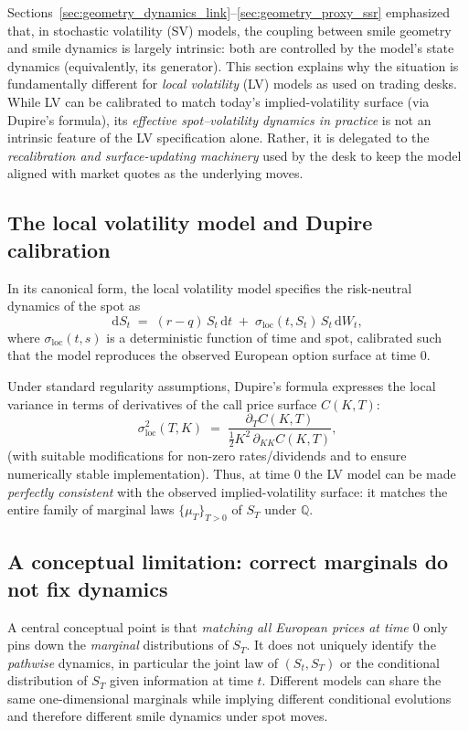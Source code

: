 \documentclass[11pt,a4paper]{report}
\begin{document}
Sections~\ref{sec:geometry_dynamics_link}--\ref{sec:geometry_proxy_ssr} emphasized that, in stochastic volatility (SV) models, the coupling between smile geometry and smile dynamics is largely intrinsic: both are controlled by the model's state dynamics (equivalently, its generator).
This section explains why the situation is fundamentally different for \emph{local volatility} (LV) models as used on trading desks.
While LV can be calibrated to match today's implied-volatility surface (via Dupire's formula), its \emph{effective spot--volatility dynamics in practice} is not an intrinsic feature of the LV specification alone.
Rather, it is delegated to the \emph{recalibration and surface-updating machinery} used by the desk to keep the model aligned with market quotes as the underlying moves.

\subsection{The local volatility model and Dupire calibration}
In its canonical form, the local volatility model specifies the risk-neutral dynamics of the spot as
\begin{equation}
\mathrm{d}S_t \;=\; (r-q)\,S_t\,\mathrm{d}t \;+\; \sigma_{\mathrm{loc}}(t,S_t)\,S_t\,\mathrm{d}W_t,
\label{eq:localvol_sde}
\end{equation}
where $\sigma_{\mathrm{loc}}(t,s)$ is a deterministic function of time and spot, calibrated such that the model reproduces the observed European option surface at time $0$.

Under standard regularity assumptions, Dupire's formula expresses the local variance in terms of derivatives of the call price surface $C(K,T)$:
\begin{equation}
\sigma_{\mathrm{loc}}^2(T,K)
\;=\;
\frac{\partial_T C(K,T)}{\tfrac{1}{2}K^2\,\partial_{KK}C(K,T)},
\label{eq:dupire}
\end{equation}
(with suitable modifications for non-zero rates/dividends and to ensure numerically stable implementation).
Thus, at time $0$ the LV model can be made \emph{perfectly consistent} with the observed implied-volatility surface:
it matches the entire family of marginal laws $\{\mu_T\}_{T>0}$ of $S_T$ under $\mathbb{Q}$.

\subsection{A conceptual limitation: correct marginals do not fix dynamics}
A central conceptual point is that \emph{matching all European prices at time $0$} only pins down the \emph{marginal} distributions of $S_T$.
It does not uniquely identify the \emph{pathwise} dynamics, in particular the joint law of $(S_t,S_T)$ or the conditional distribution of $S_T$ given information at time $t$.
Different models can share the same one-dimensional marginals while implying different conditional evolutions and therefore different smile dynamics under spot moves.
\end{document}

